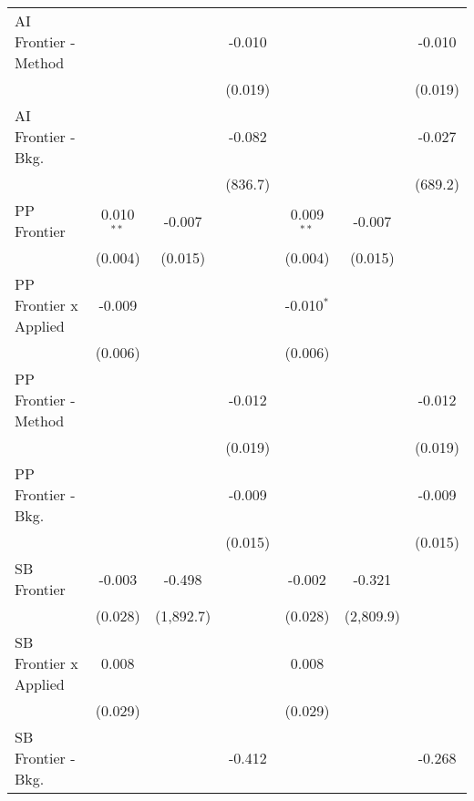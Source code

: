\begin{tabular}{lcccccc}
   AI Frontier - Method         &              &           & -0.010         &              &           & -0.010\\   
                                &              &           & (0.019)        &              &           & (0.019)\\   
   AI Frontier - Bkg.           &              &           & -0.082         &              &           & -0.027\\   
                                &              &           & (836.7)        &              &           & (689.2)\\   
   PP Frontier                  & 0.010$^{**}$ & -0.007    &                & 0.009$^{**}$ & -0.007    &   \\   
                                & (0.004)      & (0.015)   &                & (0.004)      & (0.015)   &   \\   
   PP Frontier x Applied        & -0.009       &           &                & -0.010$^{*}$ &           &   \\   
                                & (0.006)      &           &                & (0.006)      &           &   \\   
   PP Frontier - Method         &              &           & -0.012         &              &           & -0.012\\   
                                &              &           & (0.019)        &              &           & (0.019)\\   
   PP Frontier - Bkg.           &              &           & -0.009         &              &           & -0.009\\   
                                &              &           & (0.015)        &              &           & (0.015)\\   
   SB Frontier                  & -0.003       & -0.498    &                & -0.002       & -0.321    &   \\   
                                & (0.028)      & (1,892.7) &                & (0.028)      & (2,809.9) &   \\   
   SB Frontier x Applied        & 0.008        &           &                & 0.008        &           &   \\   
                                & (0.029)      &           &                & (0.029)      &           &   \\   
   SB Frontier - Bkg.           &              &           & -0.412         &              &           & -0.268\\   

\end{tabular}
